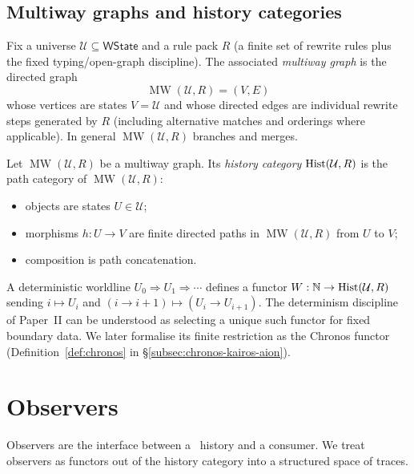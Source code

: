 \documentclass{aion}
\newcommand{\WState}{\mathsf{WState}}
\DeclareMathOperator{\MW}{MW}
\providecommand{\sectionbreak}{\clearpage}
\begin{document}
\subsection{Multiway graphs and history categories}
\label{subsec:prelim-history}

Fix a universe $\mathcal{U}\subseteq\WState$ and a rule pack $R$ (a finite set of rewrite rules plus the fixed typing/open-graph discipline).
The associated \emph{multiway graph} is the directed graph
\[
  \MW(\mathcal{U},R) = (V,E)
\]
whose vertices are states $V=\mathcal{U}$ and whose directed edges are individual rewrite steps generated by $R$
(including alternative matches and orderings where applicable).
In general $\MW(\mathcal{U},R)$ branches and merges.

\begin{definition}\label{def:hist-category}
Let $\MW(\mathcal{U},R)$ be a multiway graph.
Its \emph{history category} $\operatorname{Hist}(\mathcal{U},R)$ is the path category of $\MW(\mathcal{U},R)$:
\begin{itemize}[leftmargin=*]
  \item objects are states $U\in\mathcal{U}$;
  \item morphisms $h:U\to V$ are finite directed paths in $\MW(\mathcal{U},R)$ from $U$ to $V$;
  \item composition is path concatenation.
\end{itemize}
\end{definition}

\begin{remark}
A deterministic worldline $U_0\Rightarrow U_1\Rightarrow\cdots$ defines a functor
$W:\mathbb{N}\to\operatorname{Hist}(\mathcal{U},R)$ sending $i\mapsto U_i$ and $(i\to i{+}1)\mapsto (U_i\to U_{i+1})$.
The determinism discipline of Paper~II can be understood as selecting a unique such functor for fixed boundary data.
We later formalise its finite restriction as the Chronos functor (Definition~\ref{def:chronos} in \S\ref{subsec:chronos-kairos-aion}).
\end{remark}

\sectionbreak

\section{Observers}
\label{sec:observers}

Observers are the interface between a \WARP\ history and a consumer.
We treat observers as functors out of the history category into a structured space of traces.
\end{document}
